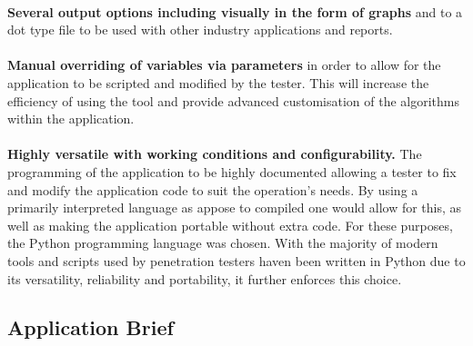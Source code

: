 \paragraph{}\textbf{Several output options including visually in the form of graphs} and to a dot type file to be used with other industry applications and reports.

\paragraph{}\textbf{Manual overriding of variables via parameters} in order to allow for the application to be scripted and modified by the tester. This will increase the efficiency of using the tool and provide advanced customisation of the algorithms within the application.

\paragraph{}\textbf{Highly versatile with working conditions and configurability.} The programming of the application to be highly documented allowing a tester to fix and modify the application code to suit the operation's needs. By using a primarily interpreted language as appose to compiled one would allow for this, as well as making the application portable without extra code. For these purposes, the Python programming language was chosen. With the majority of modern tools and scripts used by penetration testers haven been written in Python due to its versatility, reliability and portability, it further enforces this choice.


\subsection{Application Brief}
\label{brief}
